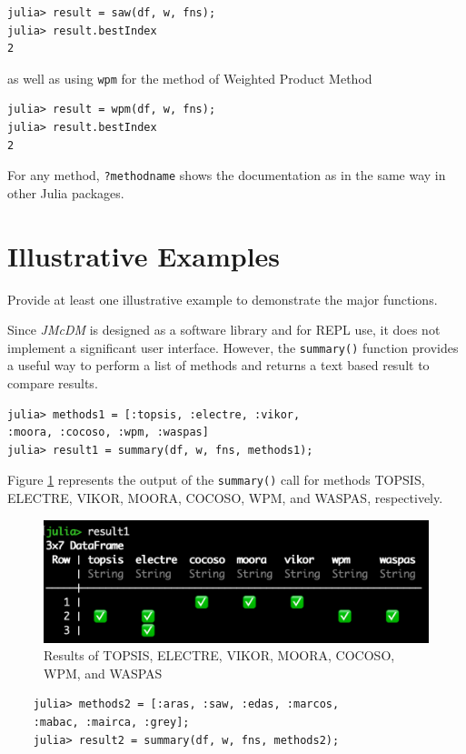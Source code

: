 \documentclass[authoryear,preprint,review,12pt]{elsarticle}
\begin{document}
\begin{verbatim}
julia> result = saw(df, w, fns);
julia> result.bestIndex
2
\end{verbatim}

\noindent as well as using \texttt{wpm} for the method of Weighted Product Method

\begin{verbatim}
julia> result = wpm(df, w, fns);
julia> result.bestIndex
2
\end{verbatim}

For any method, \texttt{?methodname} shows the documentation as in the same way in other Julia packages.

\section{Illustrative Examples}
\label{sec:Illustrative_examples}
{\color{red}Provide at least one illustrative example to demonstrate the major functions.}

Since \emph{JMcDM} is designed as a software library and for REPL use, it does not implement
a significant user interface. However, the \texttt{summary()} function provides a useful way
to perform a list of methods and returns a text based result to compare results. 

\begin{verbatim}
julia> methods1 = [:topsis, :electre, :vikor, 
:moora, :cocoso, :wpm, :waspas]
julia> result1 = summary(df, w, fns, methods1);
\end{verbatim}

Figure \ref{fig:imagea} represents the output of the \texttt{summary()} call for methods TOPSIS, ELECTRE, VIKOR, MOORA, COCOSO, WPM,  and WASPAS, respectively.

\begin{figure}
	\includegraphics[width=\columnwidth]{images/result1}
	\caption{Results of TOPSIS, ELECTRE, VIKOR, MOORA, COCOSO, WPM, and WASPAS}
	\label{fig:imagea}
	\end{figure}

\begin{verbatim}
	julia> methods2 = [:aras, :saw, :edas, :marcos, 
	:mabac, :mairca, :grey];
	julia> result2 = summary(df, w, fns, methods2);
\end{verbatim}
\end{document}
